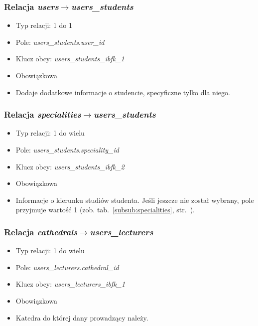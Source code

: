 \documentclass[a4paper,12pt,oneside]{report}
\begin{document}
\subsubsection{Relacja \emph{users}$\to$\emph{users\_students}}
\label{subsub:users-users_students}
\begin{itemize}
  \item Typ relacji: 1 do 1
  \item Pole: \emph{users\_students}.\emph{user\_id}
  \item Klucz obcy: \emph{users\_students\_ibfk\_1}
  \item Obowiązkowa
  \item Dodaje dodatkowe informacje o studencie, specyficzne tylko dla niego.
\end{itemize}

\subsubsection{Relacja \emph{specialities}$\to$\emph{users\_students}}
\label{subsub:specialities-users_students}
\begin{itemize}
  \item Typ relacji: 1 do wielu
  \item Pole: \emph{users\_students}.\emph{speciality\_id}
  \item Klucz obcy: \emph{users\_students\_ibfk\_2}
  \item Obowiązkowa
  \item Informacje o kierunku studiów studenta. Jeśli jeszcze nie został wybrany, pole przyjmuje wartość 1 (zob. tab.~\ref{subsub:specialities}, str.~\pageref{subsub:specialities}).
\end{itemize}

\subsubsection{Relacja \emph{cathedrals}$\to$\emph{users\_lecturers}}
\label{subsub:cathedrals-users_lecturers}
\begin{itemize}
  \item Typ relacji: 1 do wielu
  \item Pole: \emph{users\_lecturers}.\emph{cathedral\_id}
  \item Klucz obcy: \emph{users\_lecturers\_ibfk\_1}
  \item Obowiązkowa
  \item Katedra do której dany prowadzący należy.
\end{itemize}
\end{document}
